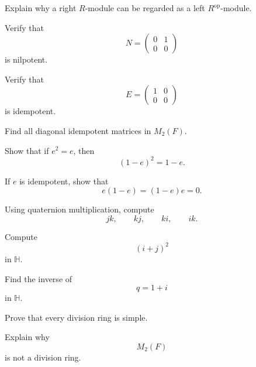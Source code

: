 \begin{exercise}[2]
Explain why a right \(R\)-module can be regarded as a left
\(R^{\mathrm{op}}\)-module.
\end{exercise}

\begin{exercise}[1]
Verify that
\[ N=\begin{pmatrix}0&1\\0&0\end{pmatrix} \]
is nilpotent.
\end{exercise}

\begin{exercise}[1]
Verify that
\[ E=\begin{pmatrix}1&0\\0&0\end{pmatrix} \]
is idempotent.
\end{exercise}

\begin{exercise}[2]
Find all diagonal idempotent matrices in \(M_2(F)\).
\end{exercise}

\begin{exercise}[2]
Show that if \(e^2=e\), then
\[ (1-e)^2=1-e. \]
\end{exercise}

\begin{exercise}[2]
If \(e\) is idempotent, show that
\[ e(1-e)=(1-e)e=0. \]
\end{exercise}

\begin{exercise}[1]
Using quaternion multiplication, compute
\[ jk,\qquad kj,\qquad ki,\qquad ik. \]
\end{exercise}

\begin{exercise}[2]
Compute
\[ (i+j)^2 \]
in \(\mathbb H\).
\end{exercise}

\begin{exercise}[2]
Find the inverse of
\[ q=1+i \]
in \(\mathbb H\).
\end{exercise}

\begin{exercise}[2]
Prove that every division ring is simple.
\end{exercise}

\begin{exercise}[2]
Explain why
\[ M_2(F) \]
is not a division ring.
\end{exercise}

